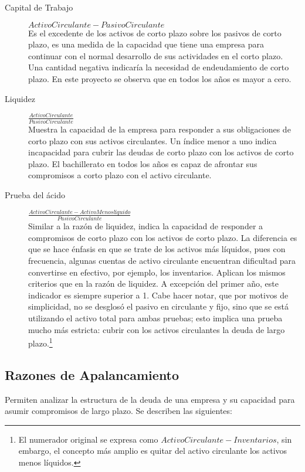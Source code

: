 \begin{description}
    \item[Capital de Trabajo         ] $ Activo Circulante-Pasivo Circulante                     $ \hfill \\
    Es el excedente de los activos de corto plazo sobre los pasivos de corto plazo, es una medida de la capacidad que tiene una empresa para continuar con el normal desarrollo de sus actividades en el corto plazo. Una cantidad negativa indicaría la necesidad de endeudamiento de corto plazo. En este proyecto se observa que en todos los años es mayor a cero.
    \item[Liquidez                   ] $ \frac{Activo Circulante}{Pasivo Circulante}             $ \hfill \\
    Muestra la capacidad de la empresa para responder a sus obligaciones de corto plazo con sus activos circulantes. Un índice menor a uno indica incapacidad para cubrir las deudas de corto plazo con los activos de corto plazo. El bachillerato en todos los años es capaz de afrontar sus compromisos a corto plazo con el activo circulante.
    \item[Prueba del ácido           ] $ \frac{Activo Circulante-Activo Menos líquido}{Pasivo Circulante} $ \hfill \\
    Similar a la razón de liquidez, indica la capacidad de responder a compromisos de corto plazo con los activos de corto plazo. La diferencia es que se hace énfasis en que se trate de los activos más líquidos, pues con frecuencia, algunas cuentas de activo circulante encuentran dificultad para convertirse en efectivo, por ejemplo, los inventarios. Aplican los mismos criterios que en la razón de liquidez. A excepción del primer año, este indicador es siempre superior a 1. Cabe hacer notar, que por motivos de simplicidad, no se desglosó el pasivo en circulante y fijo, sino que se está utilizando el activo total para ambas pruebas; esto implica una prueba mucho más estricta: cubrir con los activos circulantes la deuda de largo plazo.\footnote{El numerador original se expresa como $Activo Circulante-Inventarios$, sin embargo, el concepto más amplio es quitar del activo circulante los activos menos líquidos.}
\end{description}

\subsection{Razones de Apalancamiento}

Permiten analizar la estructura de la deuda de una empresa y su capacidad para asumir compromisos de largo plazo. Se describen las siguientes:

